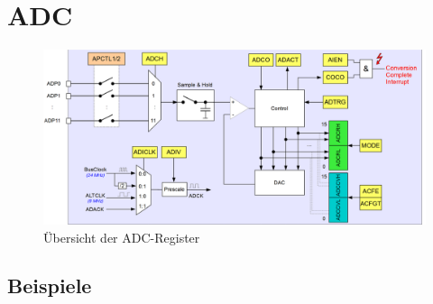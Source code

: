 \newpage
\section{ADC}

\begin{figure}[h!]
	\centering
	\includegraphics[width=1\textwidth]{../fig/adc.pdf}
	\caption{Übersicht der ADC-Register}
\end{figure}

\newpage
\subsection{Beispiele}


